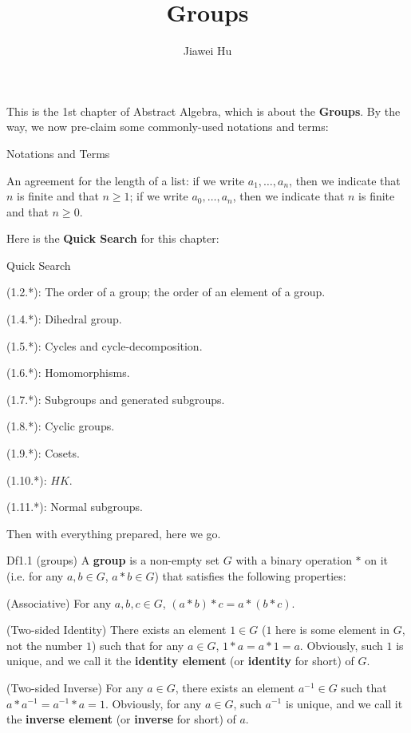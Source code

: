 \documentclass{article}
\title{\LARGE \textbf{Groups}}
\author{\large Jiawei Hu}
\begin{document}
\maketitle

This is the 1st chapter of Abstract Algebra, which is about the \textbf{Groups}. By the way, we now pre-claim some commonly-used notations and terms:
\begin{Df}{Notations and Terms}
    \begin{compactenum}
        \item An agreement for the length of a list: if we write $a_1, \dots, a_n$, then we indicate that $n$ is finite and that $n\geq 1$; if we write $a_0, \dots, a_n$, then we indicate that $n$ is finite and that $n\geq 0$.
    \end{compactenum}
\end{Df}

Here is the \textbf{Quick Search} for this chapter:
\begin{Th}{Quick Search}
    \begin{compactdesc}
        \item (1.2.*): The order of a group; the order of an element of a group.
        \item (1.4.*): Dihedral group.
        \item (1.5.*): Cycles and cycle-decomposition.
        \item (1.6.*): Homomorphisms.
        \item (1.7.*): Subgroups and generated subgroups.
        \item (1.8.*): Cyclic groups.
        \item (1.9.*): Cosets.
        \item (1.10.*): $HK$.
        \item (1.11.*): Normal subgroups.
    \end{compactdesc}
\end{Th}

Then with everything prepared, here we go. 

\begin{Df}{Df1.1 (groups)}
    A \textbf{group} is a non-empty set $G$ with a binary operation $*$ on it (i.e. for any $a, b\in G$, $a*b\in G$) that satisfies the following properties:
    \begin{compactenum}
        \item (Associative) For any $a, b, c\in G$, $(a*b)*c=a*(b*c)$.
        \item (Two-sided Identity) There exists an element $1\in G$ ($1$ here is some element in $G$, not the number $1$) such that for any $a\in G$, $1*a=a*1=a$. \textcolor{Th}{Obviously, such $1$ is unique, } and we call it the \textbf{identity element} (or \textbf{identity} for short) of $G$.
        \item (Two-sided Inverse) For any $a\in G$, there exists an element $a^{-1}\in G$ such that $a*a^{-1}=a^{-1}*a=1$. \textcolor{Th}{Obviously, for any $a\in G$, such $a^{-1}$ is unique, } and we call it the \textbf{inverse element} (or \textbf{inverse} for short) of $a$. 
    \end{compactenum}
\end{Df}
\end{document}

